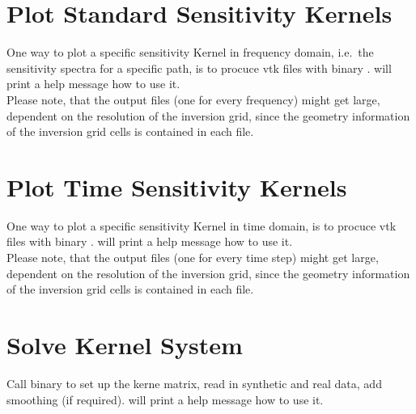 \section{Plot Standard Sensitivity Kernels} \label{basic_steps,sec:plot_kernels}
%
One way to plot a specific sensitivity Kernel in frequency domain, i.e.\ the sensitivity spectra for a specific
path, is to procuce vtk files with binary .  will print a help message 
how to use it.\\
Please note, that the output  files (one for every frequency) might get large, dependent on the resolution 
of the inversion grid, since the geometry information of the inversion grid cells is contained in each  file.
%
\section{Plot Time Sensitivity Kernels} \label{basic_steps,sec:plot_time_kernels}
%
One way to plot a specific sensitivity Kernel in time domain, is to procuce vtk files with binary . 
 will print a help message how to use it.\\
Please note, that the output  files (one for every time step) might get large, dependent on the resolution 
of the inversion grid, since the geometry information of the inversion grid cells is contained in each  file.
%
\section{Solve Kernel System} \label{basic_steps,sec:solve_kernel_system}
%
Call binary  to set up the kerne matrix, read in synthetic
and real data, add smoothing (if required).  will print a help message how to use it.

